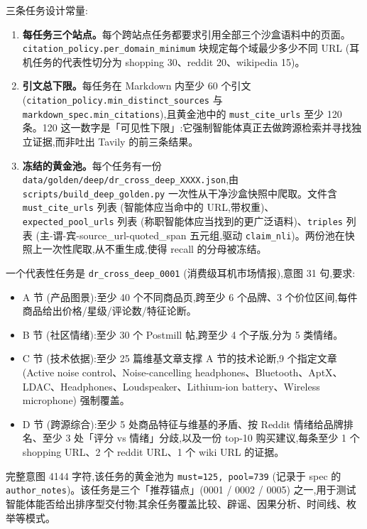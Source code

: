 \documentclass[UTF8,a4paper,12pt,oneside]{ctexart}
\begin{document}
三条任务设计常量:

\begin{enumerate}[leftmargin=2em]
\item \textbf{每任务三个站点。}每个跨站点任务都要求引用全部三个沙盒语料中的页面。\texttt{citation\_policy.per\_domain\_minimum} 块规定每个域最少多少不同 URL (耳机任务的代表性切分为 shopping 30、reddit 20、wikipedia 15)。
\item \textbf{引文总下限。}每任务在 Markdown 内至少 60 个引文 (\texttt{citation\_policy.min\_distinct\_sources} 与 \texttt{markdown\_spec.min\_citations}),且黄金池中的 \texttt{must\_cite\_urls} 至少 120 条。120 这一数字是「可见性下限」:它强制智能体真正去做跨源检索并寻找独立证据,而非吐出 Tavily 的前三条结果。
\item \textbf{冻结的黄金池。}每个任务有一份 \texttt{data/golden/deep/dr\_cross\_deep\_XXXX.json},由 \texttt{scripts/build\_deep\_golden.py} 一次性从干净沙盒快照中爬取。文件含 \texttt{must\_cite\_urls} 列表 (智能体应当命中的 URL,带权重)、\texttt{expected\_pool\_urls} 列表 (称职智能体应当找到的更广泛语料)、\texttt{triples} 列表 (主-谓-宾-source\_url-quoted\_span 五元组,驱动 \texttt{claim\_nli})。两份池在快照上一次性爬取,从不重生成,使得 recall 的分母被冻结。
\end{enumerate}

一个代表性任务是 \texttt{dr\_cross\_deep\_0001} (消费级耳机市场情报),意图 31 句,要求:

\begin{itemize}[leftmargin=2em]
\item A 节 (产品图景):至少 40 个不同商品页,跨至少 6 个品牌、3 个价位区间,每件商品给出价格/星级/评论数/特征论断。
\item B 节 (社区情绪):至少 30 个 Postmill 帖,跨至少 4 个子版,分为 5 类情绪。
\item C 节 (技术依据):至少 25 篇维基文章支撑 A 节的技术论断,9 个指定文章 (Active noise control、Noise-cancelling headphones、Bluetooth、AptX、LDAC、Headphones、Loudspeaker、Lithium-ion battery、Wireless microphone) 强制覆盖。
\item D 节 (跨源综合):至少 5 处商品特征与维基的矛盾、按 Reddit 情绪给品牌排名、至少 3 处「评分 vs 情绪」分歧,以及一份 top-10 购买建议,每条至少 1 个 shopping URL、2 个 reddit URL、1 个 wiki URL 的证据。
\end{itemize}

完整意图 4144 字符,该任务的黄金池为 \texttt{must=125, pool=739} (记录于 spec 的 \texttt{author\_notes})。该任务是三个「推荐锚点」(0001 / 0002 / 0005) 之一,用于测试智能体能否给出排序型交付物;其余任务覆盖比较、辟谣、因果分析、时间线、枚举等模式。
\end{document}
